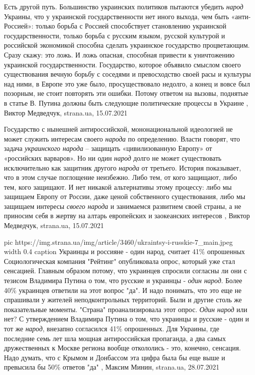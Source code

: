 Есть другой путь.  Большинство украинских политиков пытаются убедить
\emph{народ} Украины, что у украинской государственности нет иного выхода, чем
быть «анти-Россией»: только борьба с Россией способствует становлению
украинской государственности, только борьба с русским языком, русской культурой
и российской экономикой способна сделать украинское государство процветающим.
Сразу скажу: это ложь. И ложь опасная, способная привести к уничтожению
украинской государственности. Государство, которое объявило смыслом своего
существования вечную борьбу с соседями и превосходство своей расы и культуры
над ними, в Европе это уже было, просуществовало недолго, а конец и вовсе был
позорным, не стоит повторять эти ошибки.  Потому ответом на вызовы, поднятые в
статье В. Путина должны быть следующие политические процессы в Украине
, 
Виктор Медведчук, strana.ua, 15.07.2021

Государство с нынешней антироссийской, мононациональной идеологией не может
служить интересам своего \emph{народа} по определению. Власти говорят, что задача
\emph{украинского народа} – защищать «цивилизованную Европу» от «российских варваров».
Но ни один \emph{народ} долго не может существовать исключительно как защитник другого
\emph{народа} от третьего. История показывает, что в этом случае поглощение неизбежно.
Либо тем, от кого защищают, либо тем, кого защищают. И нет никакой альтернативы
этому процессу: либо мы защищаем Европу от России, даже ценой собственного
существования, либо мы защищаем интересы \emph{своего народа} и занимаемся развитием
своей страны, а не приносим себя в жертву на алтарь европейских и заокеанских
интересов
, 
Виктор Медведчук, strana.ua, 15.07.2021

\ifcmt
  pic https://img.strana.ua/img/article/3460/ukraintsy-i-russkie-7_main.jpeg
  width 0.4
	caption Украинцы и россияне - один народ, считает 41\% опрошенных 
\fi
Социологическая компания "Рейтинг" опубликовала опрос, который уже стал
сенсацией. Главным образом потому, что украинцев спросили согласны ли они с
тезисом Владимира Путина о том, что русские и украинцы - \emph{один народ}.  Более 40\%
украинцев ответили на этот вопрос "да". И надо понимать, что это еще не
спрашивали у жителей неподконтрольных территорий.  Были и другие столь же
показательные моменты.  "Страна" проанализировала этот опрос.  \emph{Один народ} или
нет?  С утверждением Владимира Путина о том, что украинцы и русские - один и
тот же \emph{народ}, внезапно согласился 41\% опрошенных.  Для Украины, где последние
семь лет шла мощная антироссийская пропаганда, а два самых дружественных к
Москве региона вообще откололись - это, конечно, сенсация.  Надо думать, что с
Крымом и Донбассом эта цифра была бы еще выше и превысила бы 50\% ответов "да"
, 
Максим Минин, strana.ua, 28.07.2021

